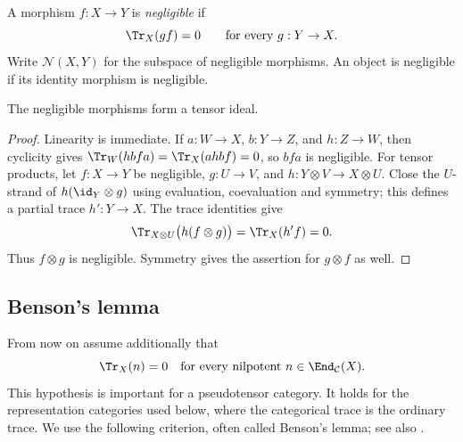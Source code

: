 \begin{definition}
A morphism $f:X\to Y$ is \emph{negligible} if
\[
 \Tr_X(gf)=0\qquad\text{for every }g:Y\to X.
\]
Write $\mathcal N(X,Y)$ for the subspace of negligible morphisms.
An object is negligible if its identity morphism is negligible.
\end{definition}

\begin{proposition}\label{prop:lec16-negligible-ideal}
The negligible morphisms form a tensor ideal.
\end{proposition}
\begin{proof}
Linearity is immediate. If $a:W\to X$, $b:Y\to Z$, and $h:Z\to W$,
then cyclicity gives
$\Tr_W(hbfa)=\Tr_X(ahbf)=0$, so $bfa$ is negligible.
For tensor products, let $f:X\to Y$ be negligible, $g:U\to V$, and
$h:Y\otimes V\to X\otimes U$. Close the $U$-strand of
$h(\id_Y\otimes g)$ using evaluation, coevaluation and symmetry;
this defines a partial trace $h':Y\to X$. The trace identities give
\[
 \Tr_{X\otimes U}\bigl(h(f\otimes g)\bigr)=\Tr_X(h'f)=0.
\]
Thus $f\otimes g$ is negligible. Symmetry gives the assertion for
$g\otimes f$ as well.
\end{proof}

\subsection{Benson's lemma}

From now on assume additionally that
\begin{equation}\label{eq:lec16-nilpotent-trace}
 \Tr_X(n)=0\quad\text{for every nilpotent }n\in\End_{\mathcal C}(X).
\end{equation}
This hypothesis is important for a pseudotensor category. It holds
for the representation categories used below, where the categorical
trace is the ordinary trace. We use the following criterion, often
called Benson's lemma; see also \cite[\S2]{EOSemisimplification}.

